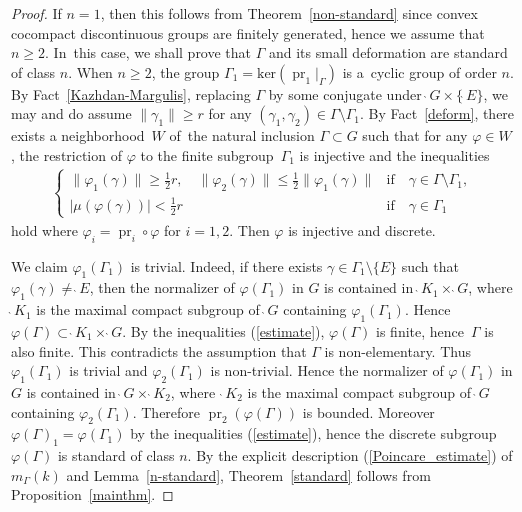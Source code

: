 \documentclass[pdftex]{sigma}
\numberwithin{equation}{section}
\begin{document}
\begin{proof}
{\samepage If $n=1$, then this follows from Theorem~\ref{non-standard}
since convex cocompact discontinuous groups are finitely generated,
hence we assume that $n\geq 2$. In~this case, we shall prove that $\Gamma$ and its small deformation
are standard of class $n$. When $n\geq2$,
the group $\Gamma_{1}=\mathrm{ker}(\operatorname{pr}_{1}|_{\Gamma})$
is a~cyclic group of order $n$.
By Fact~\ref{Kazhdan-Margulis},
replacing $\Gamma$ by some conjugate under $\grave{\ }G\times\{\grave{\ }E\}$,
we may and do assume $\|\gamma_1\|\geq r$
for any $(\gamma_1,\gamma_2)\in\Gamma\setminus\Gamma_1$.
By Fact~\ref{deform}, there exists a neighborhood~$W$ of~the natural inclusion
$\Gamma \subset G$ such that for any $\varphi\in W$,
the restriction of $\varphi$ to the finite subgroup~$\Gamma_{1}$ is injective and the inequalities
\begin{align}
\label{estimate}
\begin{cases}
\|\varphi_{1}(\gamma)\| \geq \frac{1}{2}r,\quad
\|\varphi_{2}(\gamma)\|\leq \frac{1}{2}\|\varphi_{1}(\gamma)\| &
\text{if}\quad\gamma \in \Gamma\setminus\Gamma_1,
\\[1ex]
\left|\mu(\varphi(\gamma))\right| < \frac{1}{2}r &
\text{if}\quad\gamma \in \Gamma_1
\end{cases}
\end{align}
hold where $\varphi_{i}=\operatorname{pr}_{i}\circ\varphi$ for $i=1,2$.
Then $\varphi$ is injective and discrete.

}

We claim $\varphi_1(\Gamma_1)$ is trivial.
Indeed, if there exists $\gamma \in \Gamma_1\setminus\{E\}$
such that $\varphi_1(\gamma) \neq \grave{\ }E$, then the normalizer of
$\varphi(\Gamma_1)$ in $G$ is contained in $\grave{\ }K_1\times \grave{\ }G$, where
$\grave{\ }K_1$ is the maximal compact subgroup of $\grave{\ }G$
containing $\varphi_1(\Gamma_1)$.
Hence $\varphi(\Gamma) \subset \grave{\ }K_1\times \grave{\ }G$.
By the inequalities (\ref{estimate}),
$\varphi(\Gamma)$ is finite, hence~$\Gamma$ is also finite.
This contradicts the assumption that $\Gamma$ is non-elementary.
Thus $\varphi_1(\Gamma_1)$ is trivial and
$\varphi_2(\Gamma_1)$ is non-trivial.
Hence the normalizer of $\varphi(\Gamma_{1})$ in $G$ is contained in
$\grave{\ }G\times \grave{\ }K_{2}$,
where~$\grave{\ }K_2$ is the maximal compact subgroup of $\grave{\ }G$
containing $\varphi_2(\Gamma_1)$.
Therefore $\operatorname{pr}_{2}(\varphi(\Gamma))$ is bounded.
Moreover
$\varphi(\Gamma)_{1}=\varphi(\Gamma_1)$ by the inequalities (\ref{estimate}),
hence the discrete subgroup $\varphi(\Gamma)$ is standard of class $n$.
By the explicit description (\ref{Poincare_estimate}) of $m_{\Gamma}(k)$
and Lemma~\ref{n-standard},
Theorem~\ref{standard} follows
from Proposition~\ref{mainthm}.
\end{proof}
\end{document}

